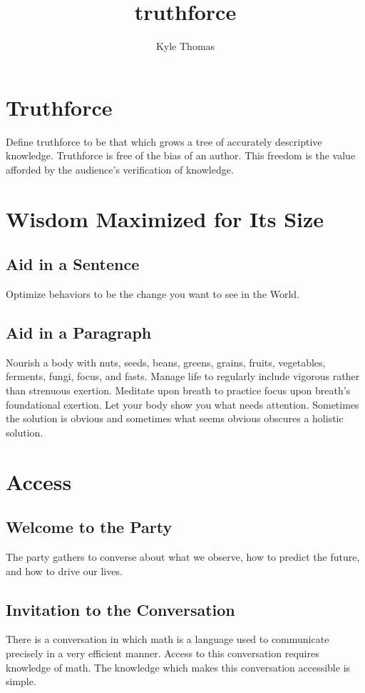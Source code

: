 \documentclass{book}
\author{Kyle Thomas}
\title{truthforce}
\begin{document}
\tableofcontents

\section{Truthforce}
Define truthforce to be that which grows a tree of accurately descriptive knowledge.
Truthforce is free of the bias of an author.
This freedom is the value afforded by the audience's verification of knowledge.

\section{Wisdom Maximized for Its Size}
\subsection{Aid in a Sentence}
Optimize behaviors to be the change you want to see in the World.

\subsection{Aid in a Paragraph}
Nourish a body with nuts, seeds, beans, greens, grains, fruits, vegetables, ferments, fungi, focus, and fasts.
Manage life to regularly include vigorous rather than strenuous exertion.
Meditate upon breath to practice focus upon breath's foundational exertion.
Let your body show you what needs attention.
Sometimes the solution is obvious and sometimes what seems obvious obscures a holistic solution.

\section{Access}
\subsection{Welcome to the Party}
The party gathers to converse about what we observe, how to predict the future, and how to drive our lives.

\subsection{Invitation to the Conversation}
There is a conversation in which math is a language used to communicate precisely in a very efficient manner.
Access to this conversation requires knowledge of math.
The knowledge which makes this conversation accessible is simple.
\end{document}
